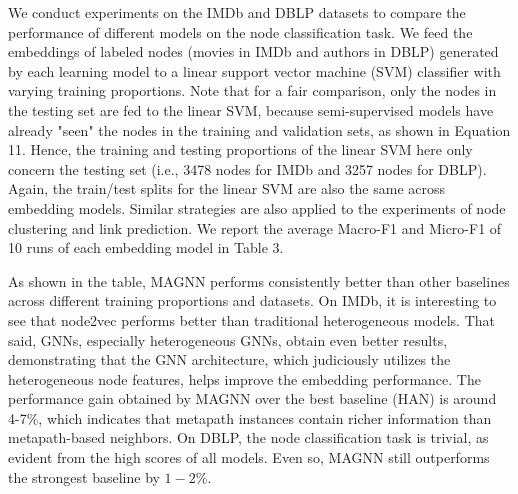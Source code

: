 We conduct experiments on the IMDb and DBLP datasets to compare the performance of different models on the node classification task. We feed the embeddings of labeled nodes (movies in IMDb and authors in DBLP) generated by each learning model to a linear support vector machine (SVM) classifier with varying training proportions. Note that for a fair comparison, only the nodes in the testing set are fed to the linear SVM, because semi-supervised models have already "seen" the nodes in the training and validation sets, as shown in Equation 11. Hence, the training and testing proportions of the linear SVM here only concern the testing set (i.e., 3478 nodes for IMDb and 3257 nodes for DBLP). Again, the train/test splits for the linear SVM are also the same across embedding models. Similar strategies are also applied to the experiments of node clustering and link prediction. We report the average Macro-F1 and Micro-F1 of 10 runs of each embedding model in Table 3.

As shown in the table, MAGNN performs consistently better than other baselines across different training proportions and datasets. On IMDb, it is interesting to see that node2vec performs better than traditional heterogeneous models. That said, GNNs, especially heterogeneous GNNs, obtain even better results, demonstrating that the GNN architecture, which judiciously utilizes the heterogeneous node features, helps improve the embedding performance. The performance gain obtained by MAGNN over the best baseline (HAN) is around 4-7\%, which indicates that metapath instances contain richer information than metapath-based neighbors. On DBLP, the node classification task is trivial, as evident from the high scores of all models. Even so, MAGNN still outperforms the strongest baseline by $1-2 \%$. 
